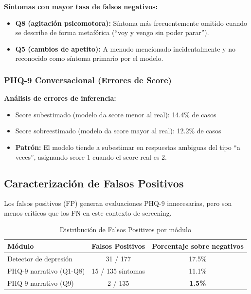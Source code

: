 \textbf{Síntomas con mayor tasa de falsos negativos:}
\begin{itemize}
    \item \textbf{Q8 (agitación psicomotora):} Síntoma más frecuentemente omitido cuando
          se describe de forma metafórica (``voy y vengo sin poder parar'').
    \item \textbf{Q5 (cambios de apetito):} A menudo mencionado incidentalmente y no
          reconocido como síntoma primario por el modelo.
\end{itemize}

\subsubsection{PHQ-9 Conversacional (Errores de Score)}

\textbf{Análisis de errores de inferencia:}
\begin{itemize}
    \item Score subestimado (modelo da score menor al real): 14.4\% de casos
    \item Score sobreestimado (modelo da score mayor al real): 12.2\% de casos
    \item \textbf{Patrón:} El modelo tiende a subestimar en respuestas ambiguas del
          tipo ``a veces'', asignando score 1 cuando el score real es 2.
\end{itemize}

\subsection{Caracterización de Falsos Positivos}

Los falsos positivos (FP) generan evaluaciones PHQ-9 innecesarias, pero son menos
críticos que los FN en este contexto de screening.

\begin{table}[H]
\centering
\caption{Distribución de Falsos Positivos por módulo}
\label{tab:false_positives}
\begin{tabular}{lcc}
\toprule
\textbf{Módulo}          & \textbf{Falsos Positivos} & \textbf{Porcentaje sobre negativos} \\
\midrule
Detector de depresión    & 31 / 177                  & 17.5\%                              \\
PHQ-9 narrativo (Q1-Q8)  & 15 / 135 síntomas         & 11.1\%                              \\
PHQ-9 narrativo (Q9)     & 2 / 135                   & \textbf{1.5\%}                      \\
\bottomrule
\end{tabular}
\end{table}

